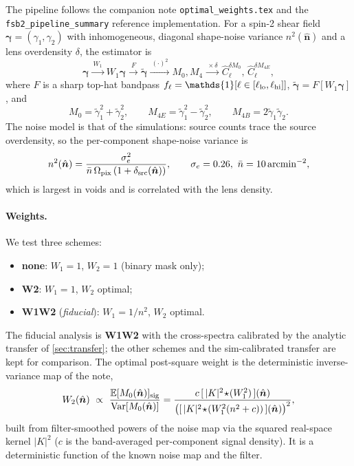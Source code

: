 \documentclass[11pt]{article}
\newcommand{\nv}{\hat{\boldsymbol{n}}}
\newcommand{\E}{\mathbb{E}}
\newcommand{\Var}{\mathrm{Var}}
\newcommand{\Wone}{W_1}
\newcommand{\Wtwo}{W_2}
\newcommand{\dt}{\delta}
\begin{document}
The pipeline follows the companion note \texttt{optimal\_weights.tex} and the
\texttt{fsb2\_pipeline\_summary} reference implementation. For a spin-2 shear
field $\bm\gamma=(\gamma_1,\gamma_2)$ with inhomogeneous, diagonal shape-noise
variance $n^2(\nv)$ and a lens overdensity $\dt$, the estimator is
\begin{equation}
\bm\gamma \xrightarrow{\ \Wone\ } \Wone\bm\gamma
\xrightarrow{\ F\ } \tilde{\bm\gamma}
\xrightarrow{\ (\cdot)^2\ } M_{0},M_4
\xrightarrow{\ \times\dt\ } \hat C_\ell^{\dt M_0},\,\hat C_\ell^{\dt M_{4E}},
\end{equation}
where $F$ is a sharp top-hat bandpass $f_\ell=\mathds{1}[\ell\in[\ell_{\rm
lo},\ell_{\rm hi}]]$, $\tilde{\bm\gamma}=F[\Wone\bm\gamma]$, and
\begin{equation}
M_0=\tilde\gamma_1^2+\tilde\gamma_2^2,\qquad
M_{4E}=\tilde\gamma_1^2-\tilde\gamma_2^2,\qquad
M_{4B}=2\tilde\gamma_1\tilde\gamma_2 .
\end{equation}
The noise model is that of the simulations: source counts trace the source
overdensity, so the per-component shape-noise variance is
\begin{equation}
n^2(\nv)=\frac{\sigma_e^2}{\bar n\,\Omega_{\rm pix}\,(1+\delta_{\rm src}(\nv))},
\qquad \sigma_e=0.26,\ \bar n = 10\,{\rm arcmin}^{-2},
\end{equation}
which is largest in voids and is correlated with the lens density.

\paragraph{Weights.}
We test three schemes:
\begin{itemize}
\item \textbf{none}: $\Wone=1$, $\Wtwo=1$ (binary mask only);
\item \textbf{W2}: $\Wone=1$, $\Wtwo$ optimal;
\item \textbf{W1W2} (\emph{fiducial}): $\Wone=1/n^2$, $\Wtwo$ optimal.
\end{itemize}
The fiducial analysis is \textbf{W1W2} with the cross-spectra calibrated by the
analytic transfer of \cref{sec:transfer}; the other schemes and the
sim-calibrated transfer are kept for comparison.
The optimal post-square weight is the deterministic inverse-variance map of the
note,
\begin{equation}
\Wtwo(\nv)\ \propto\ \frac{\E[M_0(\nv)]_{\rm sig}}{\Var[M_0(\nv)]}
=\frac{c\,[\,|K|^2\!\star\!(\Wone^2)\,](\nv)}
{\bigl([\,|K|^2\!\star\!(\Wone^2 (n^2+c))\,](\nv)\bigr)^2},
\label{eq:W2}
\end{equation}
built from filter-smoothed powers of the noise map via the squared real-space
kernel $|K|^2$ ($c$ is the band-averaged per-component signal density). It is a
deterministic function of the known noise map and the filter.
\end{document}
